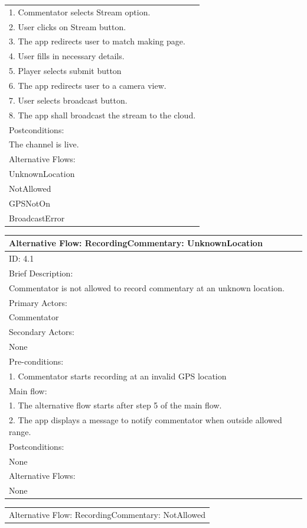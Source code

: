\documentclass{article}
\begin{document}
\begin{flushleft}
\begin{longtable}[l]{|l|}
1. Commentator selects Stream option.\\
2. User clicks on Stream button.\\
3. The app redirects user to match making page.\\
4. User fills in necessary details.\\
5. Player selects submit button\\
6. The app redirects user to a camera view.\\
7. User selects broadcast button.\\
8. The app shall broadcast the stream to the cloud.\\
\hline
Postconditions:\\
The channel is live.\\
\hline
Alternative Flows:\\
UnknownLocation\\
NotAllowed\\
GPSNotOn\\
BroadcastError\\
\hline
\end{longtable}
\begin{longtable}[l]{|l|}
\hline
Alternative Flow: RecordingCommentary: UnknownLocation\\
\hline
ID: 4.1\\
\hline
Brief Description: \\
Commentator is not allowed to record commentary at an unknown location.\\
\hline
Primary Actors:\\
Commentator\\
\hline
Secondary Actors:\\
None\\
\hline
Pre-conditions:\\
1. Commentator starts recording at an invalid GPS location\\
\hline
Main flow:\\
1. The alternative flow starts after step 5 of the main flow.\\
2. The app displays a message to notify commentator when outside allowed range.\\
\hline
Postconditions:\\
None\\
\hline
Alternative Flows:\\
None\\
\hline
\end{longtable}
\begin{longtable}[l]{|l|}
\hline
Alternative Flow: RecordingCommentary: NotAllowed\\

\end{longtable}
\end{flushleft}
\end{document}
